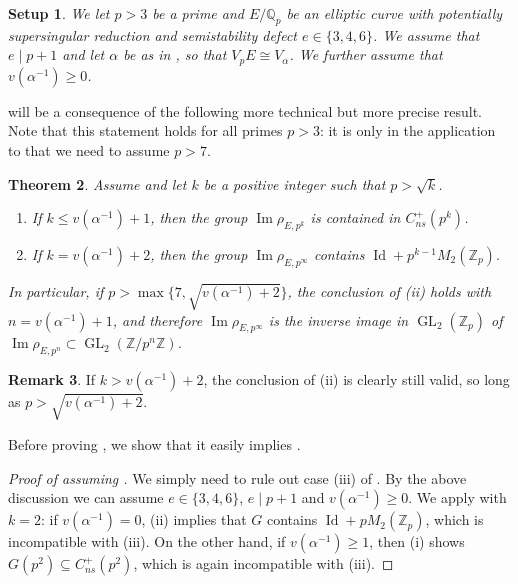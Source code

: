 \documentclass{amsart}
\newtheorem{theorem}{Theorem}
\newtheorem{setup}[theorem]{Setup}
\theoremstyle{definition}
\newtheorem{remark}[theorem]{Remark}
\newcommand{\Z}{\mathbb{Z}}
\newcommand{\Q}{\mathbb{Q}}
\newcommand{\GL}{\operatorname{GL}}
\numberwithin{theorem}{section}
\numberwithin{equation}{section}
\begin{document}
\begin{setup}\label{setup}
    We let $p>3$ be a prime and $E/\Q_p$ be an elliptic curve with potentially supersingular reduction and semistability defect $e \in \{3, 4, 6\}$. We assume that $e \mid p+1$ and let $\alpha$ be as in , so that $V_pE \cong V_\alpha$. We further assume that $v(\alpha^{-1}) \geq 0$.
\end{setup}

 will be a consequence of the following more technical but more precise result. Note that this statement holds for all primes $p>3$: it is only in the application to  that we need to assume $p>7$.

\begin{theorem}\label{thm: more precise description padic Galreps}
Assume  and let $k$ be a positive integer such that $p>\sqrt{k}$.
\begin{enumerate}
    \item If $k\leq v(\alpha^{-1})+1$, then the group $\operatorname{Im} \rho_{E, p^k}$ is contained in $C_{ns}^+(p^k)$.
    \item If $k=v(\alpha^{-1})+2$, then the group $\operatorname{Im} \rho_{E, p^\infty}$ contains $\operatorname{Id} + p^{k-1}M_2(\Z_p)$.
\end{enumerate}
In particular, if $p > \max\{7,\sqrt{v(\alpha^{-1})+2}\}$, the conclusion of (ii) holds with $n=v(\alpha^{-1})+1$, and therefore $\operatorname{Im} \rho_{E, p^\infty}$ is the inverse image in $\GL_2(\Z_p)$ of $\operatorname{Im} \rho_{E, p^n} \subset \GL_2(\Z/p^n\Z)$.
\end{theorem}


\begin{remark}
If $k>v(\alpha^{-1})+2$, the conclusion of (ii) is clearly still valid, so long as $p>\sqrt{v(\alpha^{-1})+2}$.
\end{remark}


Before proving , we show that it easily implies .

\begin{proof}[Proof of  assuming ]
We simply need to rule out case (iii) of . By the above discussion we can assume $e \in \{3,4,6\}$, $e \mid p+1$ and $v(\alpha^{-1}) \geq 0$. We apply  with $k=2$: if $v(\alpha^{-1})=0$, (ii) implies that $G$ contains $\operatorname{Id}+pM_2(\Z_p)$, which is incompatible with (iii). On the other hand, if $v(\alpha^{-1}) \geq 1$, then (i) shows $G(p^2) \subseteq C_{ns}^+(p^2)$, which is again incompatible with (iii).
\end{proof}
\end{document}
